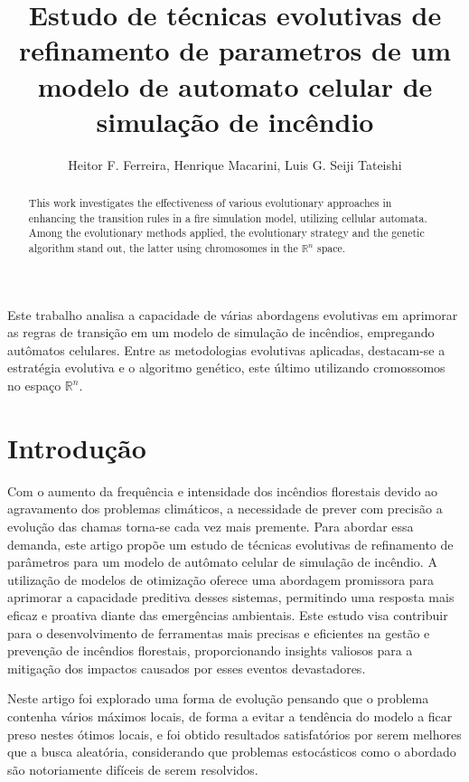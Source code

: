 \documentclass[12pt]{article}
\title{Estudo de técnicas evolutivas de refinamento de parametros de um modelo de automato celular de simulação de incêndio}
\author{Heitor F. Ferreira, Henrique Macarini, Luis G. Seiji Tateishi}
\begin{document}
\maketitle

\begin{abstract}
    This work investigates the effectiveness of various evolutionary approaches in enhancing the transition rules in a fire simulation model, utilizing cellular automata. Among the evolutionary methods applied, the evolutionary strategy and the genetic algorithm stand out, the latter using chromosomes in the \(\mathbb{R}^n\) space.
\end{abstract}

\begin{resumo}
    Este trabalho analisa a capacidade de várias abordagens evolutivas em aprimorar as regras de transição em um modelo de simulação de incêndios, empregando autômatos celulares. Entre as metodologias evolutivas aplicadas, destacam-se a estratégia evolutiva e o algoritmo genético, este último utilizando cromossomos no espaço \(\mathbb{R}^n\).
\end{resumo}


\section{Introdução}
Com o aumento da frequência e intensidade dos incêndios florestais devido ao agravamento dos problemas climáticos, a necessidade de prever com precisão a evolução das chamas torna-se cada vez mais premente. Para abordar essa demanda, este artigo propõe um estudo de técnicas evolutivas de refinamento de parâmetros para um modelo de autômato celular de simulação de incêndio. A utilização de modelos de otimização oferece uma abordagem promissora para aprimorar a capacidade preditiva desses sistemas, permitindo uma resposta mais eficaz e proativa diante das emergências ambientais. Este estudo visa contribuir para o desenvolvimento de ferramentas mais precisas e eficientes na gestão e prevenção de incêndios florestais, proporcionando insights valiosos para a mitigação dos impactos causados por esses eventos devastadores.

Neste artigo foi explorado uma forma de evolução pensando que o problema contenha vários máximos locais, de forma a evitar a tendência do modelo a ficar preso nestes ótimos locais, e foi obtido resultados satisfatórios por serem melhores que a busca aleatória, considerando que problemas estocásticos como o abordado são notoriamente difíceis de serem resolvidos.
\end{document}
